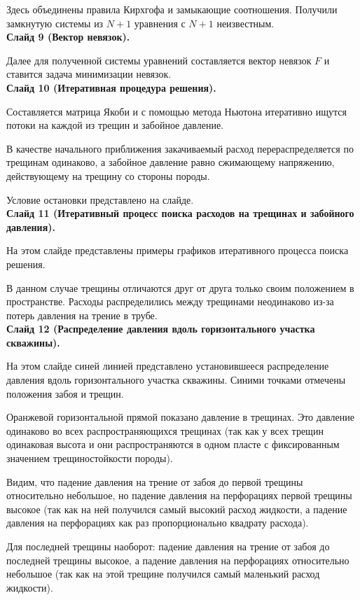 \documentclass[a4paper, 12pt]{article}
\begin{document}
Здесь объединены правила Кирхгофа и замыкающие соотношения.
Получили замкнутую системы из $N+1$ уравнения с $N+1$ неизвестным.
\\


\textbf{Слайд 9 (Вектор невязок).}

Далее для полученной системы уравнений составляется вектор невязок $F$ и ставится задача минимизации невязок.
\\


\textbf{Слайд 10 (Итеративная процедура решения).}

Составляется матрица Якоби и с помощью метода Ньютона итеративно ищутся потоки на каждой из трещин и забойное давление.

В качестве начального приближения закачиваемый расход перераспределяется по трещинам одинаково, а забойное давление равно сжимающему напряжению, действующему на трещину со стороны породы.

Условие остановки представлено на слайде.
\\


\textbf{Слайд 11 (Итеративный процесс поиска расходов на трещинах и забойного давления).}

На этом слайде представлены примеры графиков итеративного процесса поиска решения.

В данном случае трещины отличаются друг от друга только своим положением в пространстве.
Расходы распределились между трещинами неодинаково из-за потерь давления на трение в трубе.
\\


\textbf{Слайд 12 (Распределение давления вдоль горизонтального участка скважины).}

На этом слайде синей линией представлено установившееся распределение давления вдоль горизонтального участка скважины.
Синими точками отмечены положения забоя и трещин.

Оранжевой горизонтальной прямой показано давление в трещинах.
Это давление одинаково во всех распространяющихся трещинах (так как у всех трещин одинаковая высота и они распространяются в одном пласте с фиксированным значением трещиностойкости породы).

Видим, что падение давления на трение от забоя до первой трещины относительно небольшое, но падение давления на перфорациях первой трещины высокое (так как на ней получился самый высокий расход жидкости, а падение давления на перфорациях как раз пропорционально квадрату расхода).

Для последней трещины наоборот: падение давления на трение от забоя до последней трещины высокое, а падение давления на перфорациях относительно небольшое (так как на этой трещине получился самый маленький расход жидкости).
\\
\end{document}
